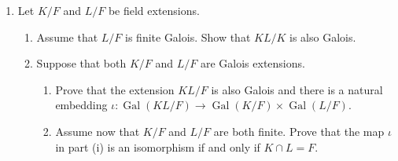 \documentclass[12pt,
psamsfonts]{amsart}
\theoremstyle{remark}
\theoremstyle{definition}
\newcommand{\R}{\mathbb{R}\xspace}
\DeclareMathOperator{\Gal}{Gal}
\numberwithin{equation}{section}
\begin{document}
\begin{enumerate}
%
\item Let $K/F$ and $L/F$ be field extensions.  \begin{enumerate}
\item Assume that $L/F$ is finite Galois. Show that $KL/K$ is also  Galois. 
\item Suppose that both $K/F$ and $L/F$ are Galois extensions. 
\begin{enumerate}
\item Prove that the extension $KL/F$ is also Galois and there is a natural embedding $\iota:\Gal(KL/F)\rightarrow\Gal(K/F)\times \Gal(L/F)$.
\item Assume now that $K/F$ and $L/F$ are both finite. Prove that the map $\iota$ in part (i) is an isomorphism if and only if $K\cap L=F$. 
\end{enumerate} 
\end{enumerate} 




\end{enumerate}
\end{document}
